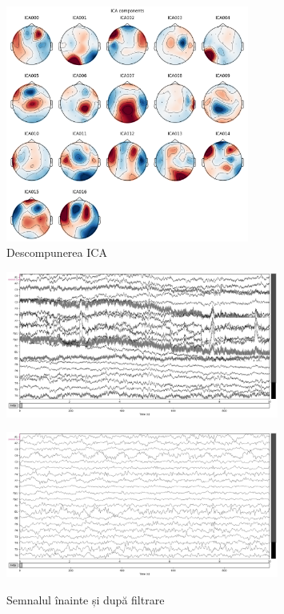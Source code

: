 \vspace{1em}
\begin{figure}[h]
    \centering
    \includegraphics[width=8cm]{images/ica_components.png}
    \caption{Descompunerea ICA}
    \label{fig:vizualizare_filtru}
\end{figure}


\setlength{\abovecaptionskip}{0pt}
\setlength{\belowcaptionskip}{0pt}
\clearpage

\begin{figure}[!htb]
    \centering
    \begin{minipage}{\textwidth}
        \centering
        \includegraphics[width=0.8\textwidth]{images/raw_inainte.png}
        \label{fig:raw_inainte}
    \end{minipage}
    \vspace{0.5cm}
    \begin{minipage}{\textwidth}
        \centering
        \includegraphics[width=0.8\textwidth]{images/raw_dupa.png}
        \label{fig:raw_dupa}
    \end{minipage}
    \caption{Semnalul înainte și după filtrare}
    \label{fig:raw_inainte_dupa}
\end{figure}

